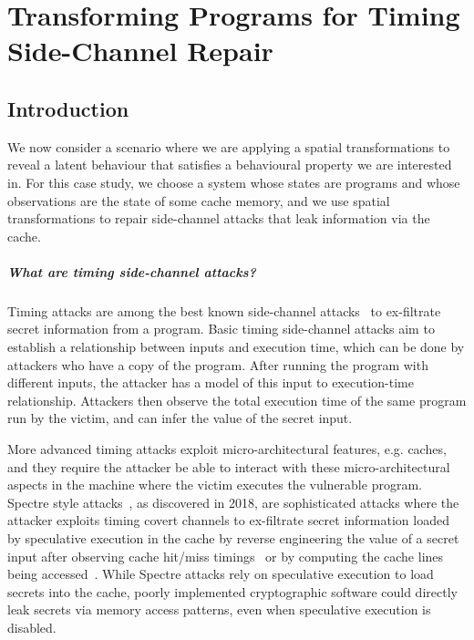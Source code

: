\chapter{Transforming Programs for Timing Side-Channel Repair}
\label{ch:SideChannelRepair}



\section{Introduction}
\label{sec:introduction} 
We now consider a scenario where we are applying a spatial transformations to reveal a latent behaviour that satisfies a behavioural property we are interested in. For this case study, we choose a system whose states are programs and whose observations are the state of some cache memory, and we use spatial transformations to repair side-channel attacks that leak information via the cache.

\paragraph*{What are timing side-channel attacks?} Timing attacks are among the best known side-channel attacks~\cite{timing-channel-survey} 
to ex-filtrate secret information from a program. %
Basic timing side-channel attacks aim to establish a relationship between inputs and execution time, which can be done by attackers who have a copy of the program. After running the program with different inputs, the attacker has a model of this input to execution-time relationship. Attackers then observe the total execution time of the same program run by the victim, and can infer the value of the secret input. 

More advanced timing attacks exploit micro-architectural features, e.g. caches, and they require the attacker be able to interact with these micro-architectural aspects in the machine where the victim executes the vulnerable program. Spectre style attacks~\cite{Spectre}, as discovered in 2018, are sophisticated attacks where the attacker exploits timing covert channels to ex-filtrate secret information loaded by speculative execution in the cache by reverse engineering the value of a secret input after observing cache hit/miss timings~\cite{timing-cache} or by computing the cache lines being accessed~\cite{prime-probe}. While Spectre attacks rely on speculative execution to load secrets into the cache, poorly implemented cryptographic software could directly leak secrets via memory access patterns, even when speculative execution is disabled.

